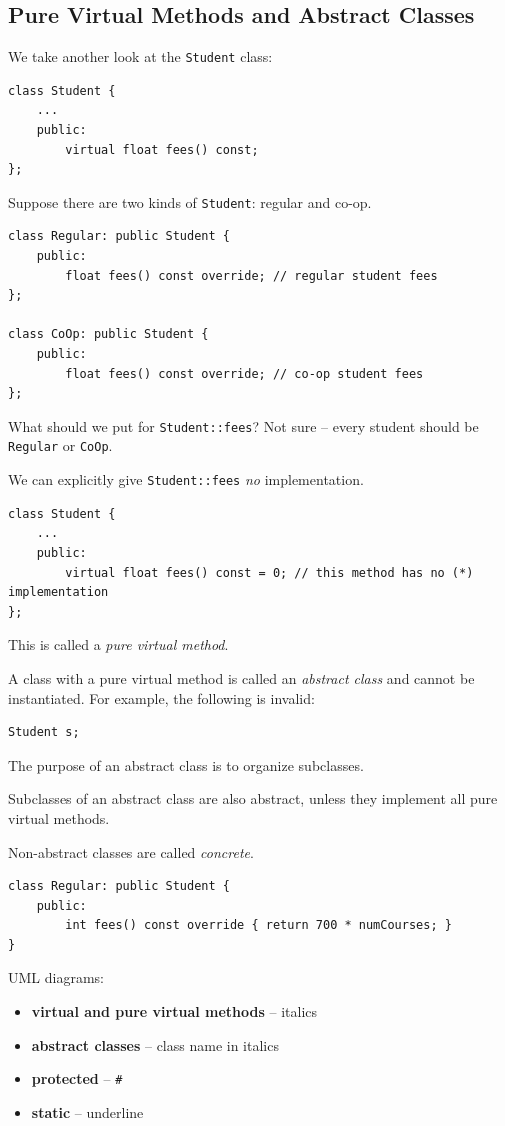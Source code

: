 \documentclass[11pt]{article}
\theoremstyle{definition}
\begin{document}
\subsection{Pure Virtual Methods and Abstract Classes}
We take another look at the {\tt Student} class:
\begin{lstlisting}
class Student {
    ...
    public:
        virtual float fees() const;
};
\end{lstlisting}
\vspace{-0.25cm}
Suppose there are two kinds of {\tt Student}: regular and co-op.
\begin{lstlisting}
class Regular: public Student {
    public:
        float fees() const override; // regular student fees
};

class CoOp: public Student {
    public:
        float fees() const override; // co-op student fees
};
\end{lstlisting}
\vspace{-0.25cm}
What should we put for {\tt Student::fees}? Not sure -- every student should be {\tt Regular} or {\tt CoOp}. 

We can explicitly give {\tt Student::fees} {\it no} implementation.
\begin{lstlisting}
class Student {
    ...
    public:
        virtual float fees() const = 0; // this method has no (*) implementation
};
\end{lstlisting}
\vspace{-0.25cm}
This is called a {\it pure virtual method}.

A class with a pure virtual method is called an {\it abstract class} and cannot be instantiated. For example, the following is invalid:
\begin{lstlisting}
Student s;
\end{lstlisting}
\vspace{-0.25cm}

The purpose of an abstract class is to organize subclasses.

Subclasses of an abstract class are also abstract, unless they implement all pure virtual methods.

Non-abstract classes are called {\it concrete}.
\begin{lstlisting}
class Regular: public Student {
    public:
        int fees() const override { return 700 * numCourses; }    
}
\end{lstlisting}
\vspace{-0.25cm}
UML diagrams:\vspace{-0.25cm}
\begin{itemize}
    \item {\bf virtual and pure virtual methods} -- italics
    \item {\bf abstract classes} -- class name in italics
    \item {\bf protected} -- {\tt \#}
    \item {\bf static} -- underline
\end{itemize} 
\end{document}
